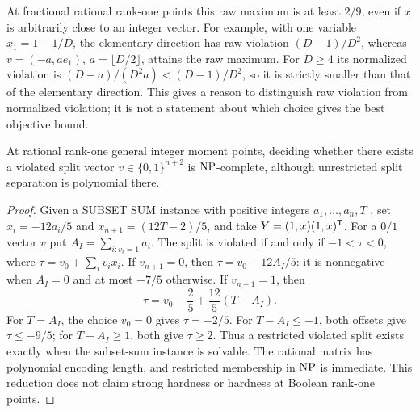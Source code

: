 At fractional rational rank-one points this raw maximum is at least
$2/9$, even if $x$ is arbitrarily close to an integer vector. For example,
with one variable $x_1=1-1/D$, the elementary direction has raw violation
$(D-1)/D^2$, whereas $v=(-a,ae_1)$, $a=\lfloor D/2\rfloor$, attains the
raw maximum. For $D\ge4$ its normalized violation is
$(D-a)/(D^2a)<(D-1)/D^2$, so it is strictly smaller than that of the
elementary direction. This gives a reason to distinguish
raw violation from normalized violation; it is not a statement about
which choice gives the best objective bound.

\begin{proposition}\label{prop:restricted-rank-one-hardness}
At rational rank-one general integer moment points, deciding whether
there exists a violated split vector $v\in\{0,1\}^{n+2}$ is
$\mathrm{NP}$-complete, although
unrestricted split separation is polynomial there.
\end{proposition}

\begin{proof}
Given a SUBSET SUM instance with positive integers $a_1,\ldots,a_n,T$
\citep{Karp1972},
set $x_i=-12a_i/5$ and $x_{n+1}=(12T-2)/5$, and take
$Y=(1,x)(1,x)^{\mathsf T}$. For a $0/1$ vector $v$ put
$A_I=\sum_{i:v_i=1}a_i$. The split is violated if and only if
$-1<\tau<0$, where
$\tau=v_0+\sum_i v_ix_i$.
If $v_{n+1}=0$, then $\tau=v_0-12A_I/5$: it is nonnegative when
$A_I=0$ and at most $-7/5$ otherwise. If $v_{n+1}=1$, then
\[
 \tau=v_0-\frac25+\frac{12}{5}(T-A_I).
\]
For $T=A_I$, the choice $v_0=0$ gives $\tau=-2/5$. For $T-A_I\le-1$,
both offsets give $\tau\le-9/5$; for $T-A_I\ge1$, both give
$\tau\ge2$. Thus a restricted violated split exists exactly when the
subset-sum instance is solvable. The rational matrix has polynomial
encoding length, and restricted membership in $\mathrm{NP}$ is immediate.
This reduction does not claim strong hardness or hardness at Boolean
rank-one points.
\end{proof}
